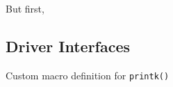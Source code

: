 But first, %

\subsection{Driver Interfaces}

\begin{listing} [ht]
	\caption{Custom macro definition for \texttt{printk()}}
	\label{lst:printk-macro}
	\begin{verbatim}

	\end{verbatim}
\end{listing}

